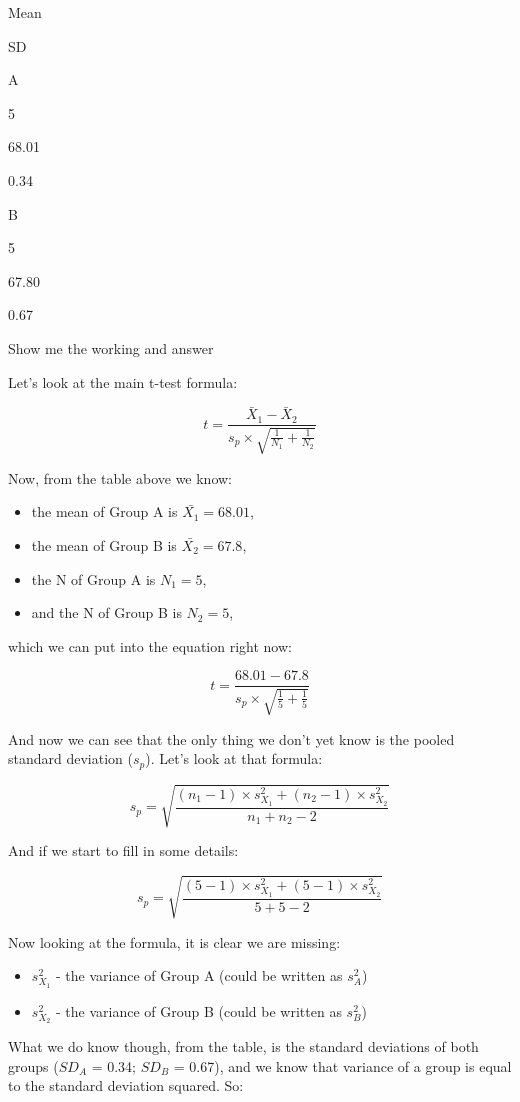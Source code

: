 \documentclass[
  oneside]{book}
\providecommand{\tightlist}{%
  \setlength{\itemsep}{0pt}\setlength{\parskip}{0pt}}
\begin{document}
Mean

SD

A

5

68.01

0.34

B

5

67.80

0.67

Show me the working and answer

Let's look at the main t-test formula:

\[t = \frac{\bar{X}_1 - \bar{X}_2}{s_p \times \sqrt{\frac{1}{N_1} + \frac{1}{N_2}}}\]

Now, from the table above we know:

\begin{itemize}
\tightlist
\item
  the mean of Group A is \(\bar{X_1} = 68.01\),
\item
  the mean of Group B is \(\bar{X_2} = 67.8\),
\item
  the N of Group A is \(N_1 = 5\),
\item
  and the N of Group B is \(N_2 = 5\),
\end{itemize}

which we can put into the equation right now:

\[t = \frac{68.01 - 67.8}{s_p \times \sqrt{\frac{1}{5} + \frac{1}{5}}}\]

And now we can see that the only thing we don't yet know is the pooled standard deviation (\(s_p\)). Let's look at that formula:

\[s_p = \sqrt{\frac{(n_1 -1)  \times s^2_{X_1} + (n_2 -1)\times s^2_{X_2}}{n_1 + n_2 - 2}}\]

And if we start to fill in some details:

\[s_p = \sqrt{\frac{(5 -1)  \times s^2_{X_1} + (5 -1)\times s^2_{X_2}}{5 + 5 - 2}}\]

Now looking at the formula, it is clear we are missing:

\begin{itemize}
\tightlist
\item
  \(s^2_{X_1}\) - the variance of Group A (could be written as \(s^2_{A}\))
\item
  \(s^2_{X_2}\) - the variance of Group B (could be written as \(s^2_{B}\))
\end{itemize}

What we do know though, from the table, is the standard deviations of both groups (\(SD_A\) = 0.34; \(SD_B\) = 0.67), and we know that variance of a group is equal to the standard deviation squared. So:
\end{document}
